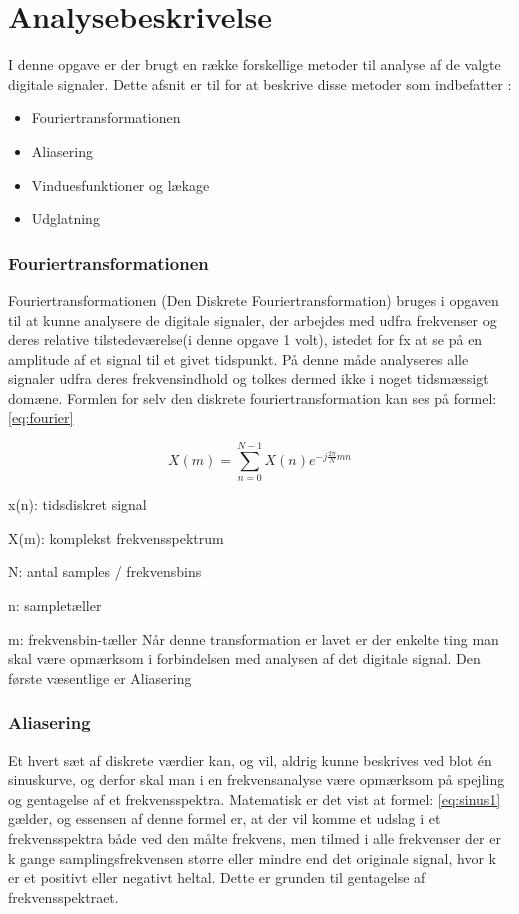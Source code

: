 \chapter{Analysebeskrivelse}\label{ch:analysebeskrivelse}

I denne opgave er der brugt en række forskellige metoder til analyse af de valgte digitale signaler. Dette afsnit er til for at beskrive disse metoder som indbefatter :
\begin{itemize}
\item Fouriertransformationen
\item Aliasering
\item Vinduesfunktioner og lækage
\item Udglatning
\end{itemize}
 
 
 
\subsection{Fouriertransformationen}

Fouriertransformationen (Den Diskrete Fouriertransformation) bruges i opgaven til at kunne analysere de digitale signaler, der arbejdes med udfra frekvenser og deres relative tilstedeværelse(i denne opgave 1 volt), istedet for fx at se på en amplitude af et signal til et givet tidspunkt. På denne måde analyseres alle signaler udfra deres frekvensindhold og tolkes dermed ikke i noget tidsmæssigt domæne. Formlen for selv den diskrete fouriertransformation kan ses på formel: \eqref{eq:fourier}

\begin{equation}\label{eq:fourier}
	{X(m)} = \displaystyle\sum_{n=0}^{N-1} {X(n)e^{-j\frac{2\pi}{N}mn}}
\end{equation}

x(n): tidsdiskret signal

X(m): komplekst frekvensspektrum

N: antal samples / frekvensbins

n: sampletæller

m: frekvensbin-tæller
\newline
\newline
 Når denne transformation er lavet er der enkelte ting man skal være opmærksom i forbindelsen med analysen af det  digitale signal. Den første væsentlige er Aliasering 


\subsection{Aliasering}
Et hvert sæt af diskrete værdier kan, og vil, aldrig kunne beskrives ved blot én sinuskurve, og derfor skal man i en frekvensanalyse være opmærksom på spejling og gentagelse af et frekvensspektra. Matematisk er det vist at formel: \eqref{eq:sinus1} gælder, og essensen af denne formel er, at der vil komme et udslag i et frekvensspektra både ved den målte frekvens, men tilmed i alle frekvenser der er k gange samplingsfrekvensen større eller mindre end det originale signal, hvor k er et positivt eller negativt heltal. Dette er grunden til gentagelse af frekvensspektraet. 

